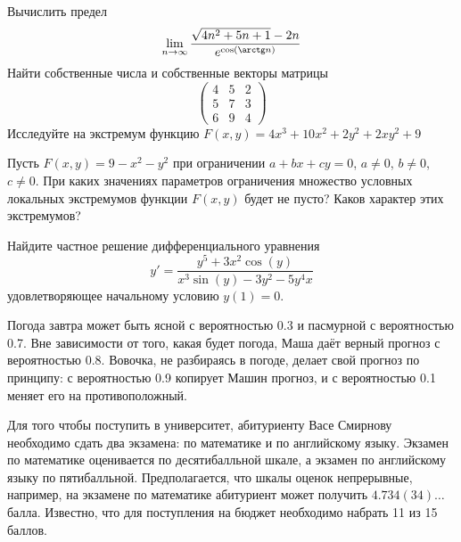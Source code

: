 \documentclass[addpoints, answers]{exam} %
\begin{document}
\begin{questions}

\question Вычислить предел
\[
\lim_{n\to\infty} \frac{\sqrt{4n^2+5n+1}-2n}{e^{\cos(\arctg n)}}
\]
\question Найти собственные числа и собственные векторы матрицы
\[
\left(
\begin{array}{ccc}
4 & 5 & 2 \\
5 & 7 & 3 \\
6 & 9 & 4
\end{array}
\right)
\]
\question Исследуйте на экстремум функцию $F(x,y)=4x^3+10x^2+2y^2+2xy^2+9$

\question Пусть $F(x,y)=9-x^2-y^2$ при ограничении $a+bx+cy=0$, $a\neq 0$, $b\neq 0$, $c\neq 0$. При каких значениях параметров
ограничения множество условных локальных экстремумов функции $F(x,y)$ будет не
пусто? Каков характер этих экстремумов?

\question  Найдите частное решение дифференциального уравнения
\[
y'=\frac{y^5+3x^2\cos(y)}{x^3\sin(y)-3y^2-5y^4x}
\]
удовлетворяющее начальному условию $y(1)=0$.

\question Погода завтра может быть ясной с вероятностью 0.3 и пасмурной с вероятностью 0.7.
Вне зависимости от того, какая будет погода, Маша даёт верный прогноз с вероятностью
0.8. Вовочка, не разбираясь в погоде, делает свой прогноз по принципу: с вероятностью
0.9 копирует Машин прогноз, и с вероятностью 0.1 меняет его на противоположный.


\question Для того чтобы поступить в университет, абитуриенту Васе Смирнову необходимо
сдать два экзамена: по математике и по английскому языку. Экзамен по математике
оценивается по десятибалльной шкале, а экзамен по английскому языку по пятибалльной.
Предполагается, что шкалы оценок непрерывные, например, на экзамене по математике
абитуриент может получить $4.734(34)\ldots$ балла. Известно, что для поступления на бюджет
необходимо набрать 11 из 15 баллов.



\end{questions}
\end{document}
